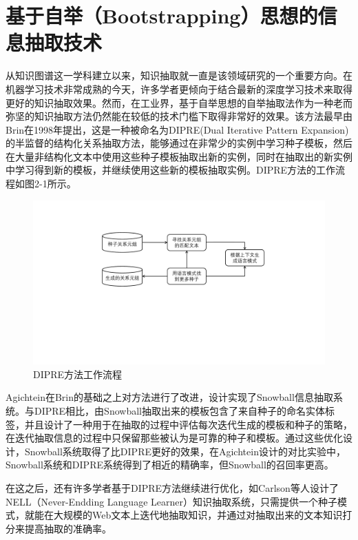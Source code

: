 \section{基于自举（Bootstrapping）思想的信息抽取技术}
从知识图谱这一学科建立以来，知识抽取就一直是该领域研究的一个重要方向。在机器学习技术非常成熟的今天，许多学者更倾向于结合最新的深度学习技术来取得更好的知识抽取效果。然而，在工业界，基于自举思想的自举抽取法作为一种老而弥坚的知识抽取方法仍然能在较低的技术门槛下取得非常好的效果。该方法最早由Brin在1998年提出\cite{DBLP:conf/webdb/Brin98}，这是一种被命名为DIPRE(Dual Iterative Pattern Expansion)的半监督的结构化关系抽取方法，能够通过在非常少的实例中学习种子模板，然后在大量非结构化文本中使用这些种子模板抽取出新的实例，同时在抽取出的新实例中学习得到新的模板，并继续使用这些新的模板抽取实例。DIPRE方法的工作流程如图2-1所示。

\begin{figure}[htb]
    \centering
    \includegraphics[width=\textwidth]{image/DIPRE.pdf}
    \caption{DIPRE方法工作流程\cite{DBLP:conf/webdb/Brin98}} 
    \label{fig:fig1} 
\end{figure}

Agichtein\cite{DBLP:conf/sigmod/AgichteinGV01}在Brin的基础之上对方法进行了改进，设计实现了Snowball信息抽取系统。与DIPRE相比，由Snowball抽取出来的模板包含了来自种子的命名实体标签，并且设计了一种用于在抽取的过程中评估每次迭代生成的模板和种子的策略，在迭代抽取信息的过程中只保留那些被认为是可靠的种子和模板。通过这些优化设计，Snowball系统取得了比DIPRE更好的效果，在Agichtein设计的对比实验中，Snowball系统和DIPRE系统得到了相近的精确率，但Snowball的召回率更高。

在这之后，还有许多学者基于DIPRE方法继续进行优化，如Carlson等人\cite{DBLP:conf/aaai/CarlsonBKSHM10}设计了NELL（Never-Endding Language Learner）知识抽取系统，只需提供一个种子模式，就能在大规模的Web文本上迭代地抽取知识，并通过对抽取出来的文本知识打分来提高抽取的准确率。

